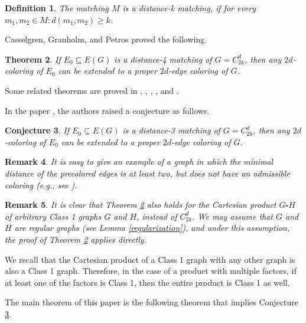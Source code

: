 \documentclass[a4paper,12pt]{article}
\newtheorem{theorem}{\bf Theorem}[section]
\newtheorem{remark}[theorem]{\bf Remark}
\newtheorem{defi}[theorem]{\bf Definition}
\newtheorem{conjecture}[theorem]{\bf Conjecture}
\begin{document}
\begin{defi}
    \textup{The matching $M$ is a \textit{distance-k matching}, if for every $m_1, m_2 \in M: d(m_1,m_2) \geq k$.}
\end{defi}

Casselgren, Granholm, and Petros \cite{Casselgren} proved the following.

\begin{theorem} \label{distance-4}
    If $E_0 \subseteq E(G)$ is a distance-4 matching of $G = C^d_{2k}$, then any $2d$-coloring of $E_0$ can be extended to a proper $2d$-edge coloring of $G$.
\end{theorem}

Some related theorems are proved in \cite{cassel2}, \cite{cassel3}, \cite{cassel4}, 
\cite{cassel5}, \cite{Edwards} and \cite{Marcotte}.

In the paper \cite{Casselgren}, the authors raised a conjecture as follows.

\begin{conjecture} \label{conjecture}
    If $E_0 \subseteq E(G)$ is a distance-3 matching of $G = C^d_{2k}$, then any $2d$-coloring of $E_0$ can be extended to a proper $2d$-edge coloring of $G$.
\end{conjecture}

\begin{remark} \label{dist-2}
    \textup{It is easy to give  an example of a graph in which the minimal distance of the precolored edges is at least two, but does not have an admissible coloring  (e.g., see \cite{Casselgren}).}
\end{remark}

\begin{remark}
    \textup{It is clear that Theorem \ref{distance-4} also holds for the Cartesian product $G \square H$ of arbitrary Class 1 graphs $G$ and $H$, instead of $C^d_{2k}$. We may assume that $G$ and $H$ are regular graphs (see Lemma \ref{regularization}), and under this assumption, the proof of Theorem \ref{distance-4} applies directly.}
\end{remark}

We recall that the Cartesian product of a Class 1 graph with any other graph is also a Class 1 graph. Therefore, in the case of a product with multiple factors, if at least one of the factors is Class 1, then the entire product is Class 1 as well.

The main theorem of this paper is the following theorem that implies Conjecture \ref{conjecture}.
\end{document}
